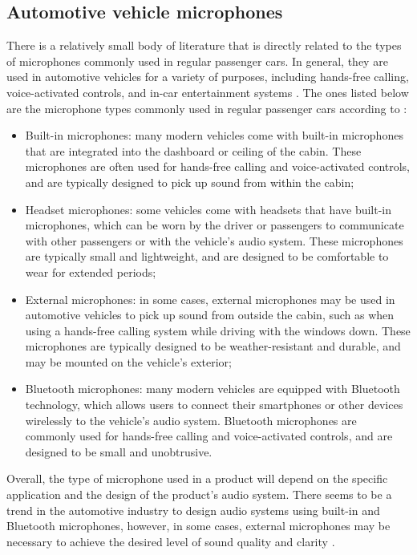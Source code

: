 \subsection{Automotive vehicle microphones}
\label{subsec:microphones_automotive_vehicle}

There is a relatively small body of literature that is directly related to the types of microphones commonly used in regular passenger cars. In general, they are used in automotive vehicles for a variety of purposes, including hands-free calling, voice-activated controls, and in-car entertainment systems \cite{Newcomb2008}. The ones listed below are the microphone types commonly used in regular passenger cars according to \textcite{Rumreich2005}:

\begin{itemize}
    \item Built-in microphones: many modern vehicles come with built-in microphones that are integrated into the dashboard or ceiling of the cabin. These microphones are often used for hands-free calling and voice-activated controls, and are typically designed to pick up sound from within the cabin;
    \item Headset microphones: some vehicles come with headsets that have built-in microphones, which can be worn by the driver or passengers to communicate with other passengers or with the vehicle's audio system. These microphones are typically small and lightweight, and are designed to be comfortable to wear for extended periods;
    \item External microphones: in some cases, external microphones may be used in automotive vehicles to pick up sound from outside the cabin, such as when using a hands-free calling system while driving with the windows down. These microphones are typically designed to be weather-resistant and durable, and may be mounted on the vehicle's exterior;
    \item Bluetooth microphones: many modern vehicles are equipped with Bluetooth technology, which allows users to connect their smartphones or other devices wirelessly to the vehicle's audio system. Bluetooth microphones are commonly used for hands-free calling and voice-activated controls, and are designed to be small and unobtrusive.
\end{itemize}

Overall, the type of microphone used in a product will depend on the specific application and the design of the product's audio system. There seems to be a trend in the automotive industry to design audio systems using built-in and Bluetooth microphones, however, in some cases, external microphones may be necessary to achieve the desired level of sound quality and clarity \cite{Rayburn2004}.

